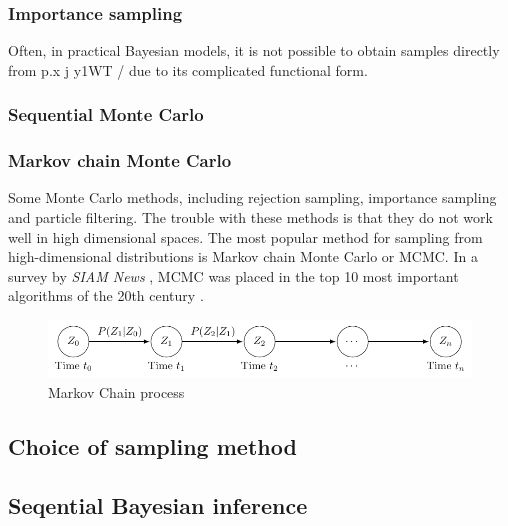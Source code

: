 \subsubsection{Importance sampling}

Often, in practical Bayesian models, it is not possible to obtain samples directly from p.x j y1WT / due to its complicated functional form.

\subsubsection{Sequential Monte Carlo}


\subsubsection{Markov chain Monte Carlo}
Some Monte Carlo methods, including rejection sampling, importance sampling and particle filtering. The trouble with these methods is that they do not work well in high
dimensional spaces. The most popular method for sampling from high-dimensional distributions
is Markov chain Monte Carlo or MCMC. In a survey by \textit{SIAM News}
, MCMC was placed in the
top 10 most important algorithms of the 20th century \citep{murphy2012}.
\begin{figure}[H]
    \centering
    \includegraphics[width = 150mm]{Figures/figure-markov_process.pdf}
    \caption{Markov Chain process}
    \label{fig:figure-markovchain}
\end{figure}


\subsection{Choice of sampling method}


\subsection{Seqential Bayesian inference}